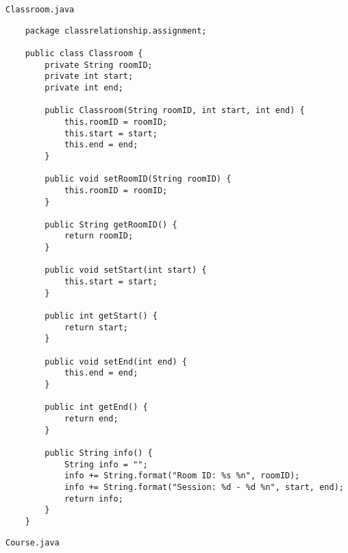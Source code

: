 \documentclass[12pt,titlepage]{article}
\begin{document}
\texttt{Classroom.java}
\begin{verbatim}
    package classrelationship.assignment;

    public class Classroom {
        private String roomID;
        private int start;
        private int end;

        public Classroom(String roomID, int start, int end) {
            this.roomID = roomID;
            this.start = start;
            this.end = end;
        }
        
        public void setRoomID(String roomID) {
            this.roomID = roomID;
        }

        public String getRoomID() {
            return roomID;
        }

        public void setStart(int start) {
            this.start = start;
        }

        public int getStart() {
            return start;
        }

        public void setEnd(int end) {
            this.end = end;
        }

        public int getEnd() {
            return end;
        }

        public String info() {
            String info = "";
            info += String.format("Room ID: %s %n", roomID);
            info += String.format("Session: %d - %d %n", start, end);
            return info;
        }
    }
\end{verbatim}
\texttt{Course.java}
\end{document}
